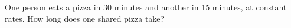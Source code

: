 One person eats a pizza in 30 minutes and another in 15 minutes, at constant rates. How long does one shared pizza take?
